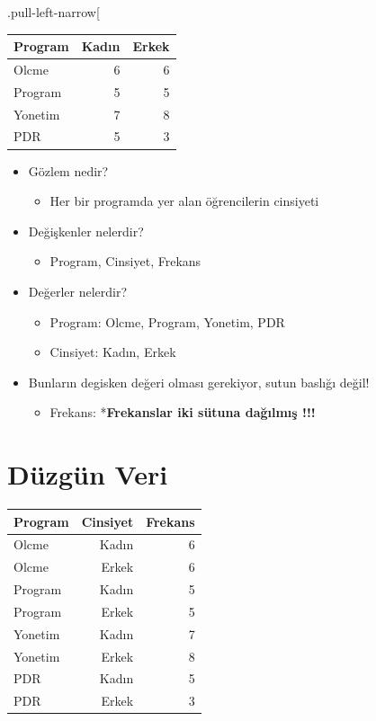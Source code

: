 \documentclass[
  oneside]{book}
\providecommand{\tightlist}{%
  \setlength{\itemsep}{0pt}\setlength{\parskip}{0pt}}
\begin{document}
.pull-left-narrow{[}

\begin{longtable}[]{@{}lrr@{}}
\toprule\noalign{}
\textbf{Program} & \textbf{Kadın} & \textbf{Erkek} \\
\midrule\noalign{}
\endhead
\bottomrule\noalign{}
\endlastfoot
Olcme & 6 & 6 \\
Program & 5 & 5 \\
Yonetim & 7 & 8 \\
PDR & 5 & 3 \\
\end{longtable}

\begin{itemize}
\tightlist
\item
  Gözlem nedir?

  \begin{itemize}
  \tightlist
  \item
    Her bir programda yer alan öğrencilerin cinsiyeti
  \end{itemize}
\item
  Değişkenler nelerdir?

  \begin{itemize}
  \tightlist
  \item
    Program, Cinsiyet, Frekans
  \end{itemize}
\item
  Değerler nelerdir?

  \begin{itemize}
  \tightlist
  \item
    Program: Olcme, Program, Yonetim, PDR
  \item
    Cinsiyet: Kadın, Erkek
  \end{itemize}
\item
  Bunların degisken değeri olması gerekiyor, sutun baslığı değil!

  \begin{itemize}
  \tightlist
  \item
    Frekans: *\textbf{Frekanslar iki sütuna dağılmış !!!}
  \end{itemize}
\end{itemize}

\hypertarget{duxfczguxfcn-veri}{%
\section{Düzgün Veri}\label{duxfczguxfcn-veri}}

\begin{longtable}[]{@{}lrr@{}}
\toprule\noalign{}
\textbf{Program} & \textbf{Cinsiyet} & \textbf{Frekans} \\
\midrule\noalign{}
\endhead
\bottomrule\noalign{}
\endlastfoot
Olcme & Kadın & 6 \\
Olcme & Erkek & 6 \\
Program & Kadın & 5 \\
Program & Erkek & 5 \\
Yonetim & Kadın & 7 \\
Yonetim & Erkek & 8 \\
PDR & Kadın & 5 \\
PDR & Erkek & 3 \\
\end{longtable}
\end{document}
